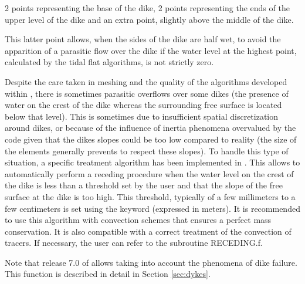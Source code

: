  2 points representing the base of the dike, 2 points representing the ends of the upper level of the dike and an extra point, slightly above the middle of the dike.



 This latter point allows, when the sides of the dike are half wet, to avoid the apparition of a parasitic flow over the dike if the water level at the highest point, calculated by the tidal flat algorithms, is not strictly zero.

 Despite the care taken in meshing and the quality of the algorithms developed within , there is sometimes parasitic overflows over some dikes (the presence of water on the crest of the dike whereas the surrounding free surface is located below that level). This is sometimes due to insufficient spatial discretization around dikes, or because of the influence of inertia phenomena overvalued by the code given that the dikes slopes could be too low compared to reality (the size of the elements generally prevents to respect these slopes). To handle this type of situation, a specific treatment algorithm has been implemented in . This allows to automatically perform a receding procedure when the water level on the crest of the dike is less than a threshold set by the user and that the slope of the free surface at the dike is too high. This threshold, typically of a few millimeters to a few centimeters is set using the keyword  (expressed in meters). It is recommended to use this algorithm with  convection schemes that ensures a perfect mass conservation. It is also compatible with a correct treatment of the convection of tracers. If necessary, the user can refer to the subroutine RECEDING.f.

 Note that release 7.0 of  allows taking into account the phenomena of dike failure. This function is described in detail in Section \ref{sec:dykes}.


